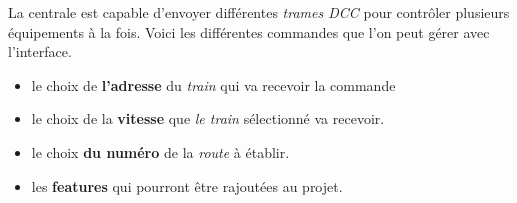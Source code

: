 La centrale est capable d'envoyer différentes \emph{trames DCC}
pour contrôler plusieurs équipements à la fois. Voici les différentes
commandes que l'on peut gérer avec l'interface.


\begin{itemize}
    \item le choix de \textbf{l'adresse} du \emph{train} qui va
      recevoir la commande
    \item le choix de la \textbf{vitesse} que \emph{le train} s\'electionn\'e
      va recevoir. 
    \item le choix  \textbf{du numéro} de la \emph{route} \`a \'etablir.
    \item les \textbf{features} qui pourront \^etre rajout\'ees au
      projet. 
  \end{itemize}


